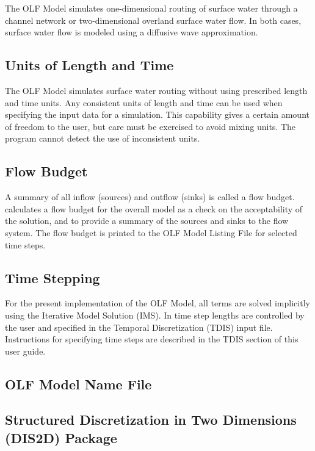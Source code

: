 The OLF Model simulates one-dimensional routing of surface water through a channel network or two-dimensional overland surface water flow.  In both cases, surface water flow is modeled using a diffusive wave approximation.

\subsection{Units of Length and Time}
The OLF Model simulates surface water routing without using prescribed length and time units. Any consistent units of length and time can be used when specifying the input data for a simulation. This capability gives a certain amount of freedom to the user, but care must be exercised to avoid mixing units.  The program cannot detect the use of inconsistent units.

\subsection{Flow Budget}
A summary of all inflow (sources) and outflow (sinks) is called a flow budget.  \mf calculates a flow budget for the overall model as a check on the acceptability of the solution, and to provide a summary of the sources and sinks to the flow system.  The flow budget is printed to the OLF Model Listing File for selected time steps.

\subsection{Time Stepping}

For the present implementation of the OLF Model, all terms are solved implicitly using the Iterative Model Solution (IMS).  In \mf time step lengths are controlled by the user and specified in the Temporal Discretization (TDIS) input file.  Instructions for specifying time steps are described in the TDIS section of this user guide.  

\newpage
\subsection{OLF Model Name File}


\newpage
\subsection{Structured Discretization in Two Dimensions (DIS2D) Package}


